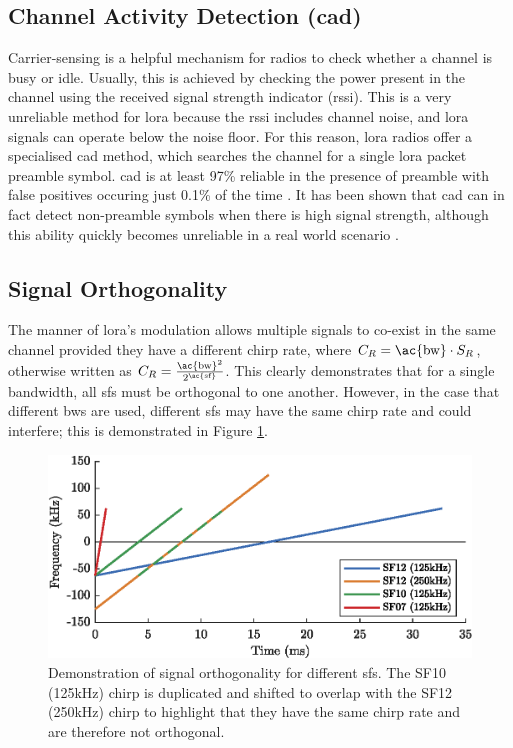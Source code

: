 \subsection{Channel Activity Detection (\ac{cad})}\label{sec:cad}
Carrier-sensing is a helpful mechanism for radios to check whether a channel is busy or idle. Usually, this is achieved by checking the power present in the channel using the received signal strength indicator (\ac{rssi}). This is a very unreliable method for \ac{lora} because the \ac{rssi} includes channel noise, and \ac{lora} signals can operate below the noise floor. For this reason, \ac{lora} radios offer a specialised \ac{cad} method, which searches the channel for a single \ac{lora} packet preamble symbol. \ac{cad} is at least 97\% reliable in the presence of preamble with false positives occuring just 0.1\% of the time \cite{3YP:LORA_FOR_IOT}. It has been shown that \ac{cad} can in fact detect non-preamble symbols when there is high signal strength, although this ability quickly becomes unreliable in a real world scenario \cite{3YP:LORA_CSMA}.

\subsection{Signal Orthogonality}\label{sec:sf_orthogonality}
The manner of \ac{lora}'s modulation allows multiple signals to co-exist in the same channel provided they have a different chirp rate, where $C_R = \text{\ac{bw}} \cdot S_R$, otherwise written as $C_R = \frac{\text{\ac{bw}}^2}{2^{\text{\ac{sf}}}}$. This clearly demonstrates that for a single bandwidth, all \ac{sf}s must be orthogonal to one another. However, in the case that different \ac{bw}s are used, different \ac{sf}s may have the same chirp rate and could interfere; this is demonstrated in Figure \ref{fig:orthogonality}.

\begin{figure}[H]
    \centering
   	\includegraphics{Figures/sf_orthogonality_plot.eps}
    \caption[Signal chirp rate orthogonality]{
    Demonstration of signal orthogonality for different \ac{sf}s. The SF10 (125kHz) chirp is duplicated and shifted to overlap with the  SF12 (250kHz) chirp to highlight that they have the same chirp rate and are therefore not orthogonal.
    }
    \label{fig:orthogonality}
\end{figure}

